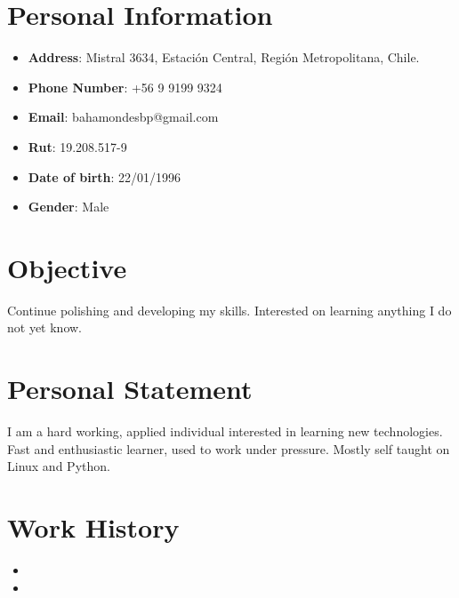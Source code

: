 \documentclass[11pt,a4paper,roman]{moderncv}        %
\begin{document}
\makecvtitle
\vspace*{-10mm}

\section{Personal Information}

\begin{itemize}

\item{\textbf{Address}: Mistral 3634, Estación Central, Región Metropolitana, Chile.}

\item{\textbf{Phone Number}: +56 9 9199 9324}

\item{\textbf{Email}: bahamondesbp@gmail.com}

\item{\textbf{Rut}: 19.208.517-9}

\item{\textbf{Date of birth}: 22/01/1996}

\item{\textbf{Gender}: Male}\\

\end{itemize}

\section{Objective}
\small{ Continue polishing and developing my skills. Interested on learning anything I do not yet know.  }

\section{Personal Statement}
\small{ I am a hard working, applied individual interested in learning new technologies. Fast and enthusiastic learner, used to work under pressure. Mostly self taught on Linux and Python.}

\section{Work History}

\vspace{3pt}

\begin{itemize}

\item{}
\item{}

\end{itemize}
\end{document}
